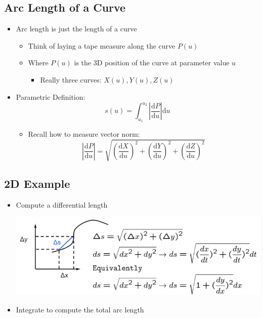 \documentclass{article}
\begin{document}
\subsection*{Arc Length of a Curve}
\begin{itemize}
    \item Arc length is just the length of a curve
    \begin{itemize}
        \item Think of laying a tape measure along the curve $P(u)$
        \item Where $P(u)$ is the 3D position of the curve at parameter value $u$
        \begin{itemize}
            \item Really three curves: $X(u), Y(u), Z(u)$
        \end{itemize}
    \end{itemize}
    \item Parametric Definition:
    \[s(u) = \int_{u_1}^{u_2} \left\vert \frac{\text{d}P}{\text{d}u}\right\vert\text{d}u\]
    \begin{itemize}
        \item Recall how to measure vector norm:
        \[\left\vert \frac{\text{d}P}{\text{d}u}\right\vert = \sqrt{\left(\frac{\text{d}X}{\text{d}u}\right)^2 + \left(\frac{\text{d}Y}{\text{d}u}\right)^2 + \left(\frac{\text{d}Z}{\text{d}u}\right)^2}\]
    \end{itemize}
\end{itemize}

\subsection*{2D Example}
\begin{itemize}
    \item Compute a differential length
    \begin{center}
        \includegraphics*[scale=0.8]{W4_1.png}
    \end{center}
    \item Integrate to compute the total arc length
\end{itemize} 
\end{document}
